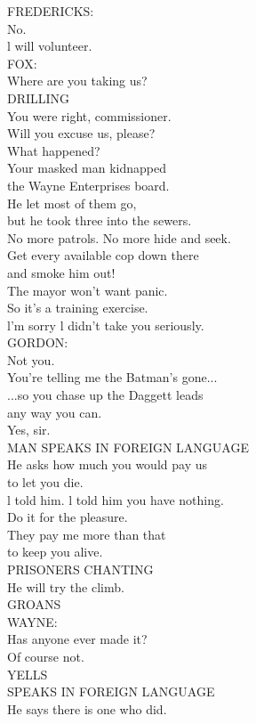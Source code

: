\documentclass{article}
\begin{document}
\begin{multicols}{3}
FREDERICKS:\\
No.\\
l will volunteer.\\
FOX:\\
Where are you taking us?\\
DRILLING\\
You were right, commissioner.\\
Will you excuse us, please?\\
What happened?\\
Your masked man kidnapped\\
the Wayne Enterprises board.\\
He let most of them go,\\
but he took three into the sewers.\\
No more patrols. No more hide and seek.\\
Get every available cop down there\\
and smoke him out!\\
The mayor won't want panic.\\
So it's a training exercise.\\
l'm sorry l didn't take you seriously.\\
GORDON:\\
Not you.\\
You're telling me the Batman's gone...\\
...so you chase up the Daggett leads\\
any way you can.\\
Yes, sir.\\
MAN SPEAKS IN FOREIGN LANGUAGE\\
He asks how much you would pay us\\
to let you die.\\
l told him. l told him you have nothing.\\
Do it for the pleasure.\\
They pay me more than that\\
to keep you alive.\\
PRISONERS CHANTING\\
He will try the climb.\\
GROANS\\
WAYNE:\\
Has anyone ever made it?\\
Of course not.\\
YELLS\\
SPEAKS IN FOREIGN LANGUAGE\\
He says there is one who did.\\

\end{multicols}
\end{document}
